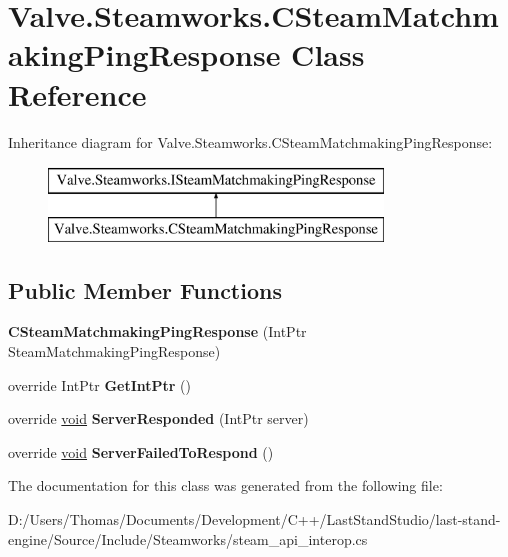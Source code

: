 \hypertarget{classValve_1_1Steamworks_1_1CSteamMatchmakingPingResponse}{}\section{Valve.\+Steamworks.\+C\+Steam\+Matchmaking\+Ping\+Response Class Reference}
\label{classValve_1_1Steamworks_1_1CSteamMatchmakingPingResponse}
Inheritance diagram for Valve.\+Steamworks.\+C\+Steam\+Matchmaking\+Ping\+Response\+:\begin{figure}[H]
\begin{center}
\leavevmode
\includegraphics[height=2.000000cm]{classValve_1_1Steamworks_1_1CSteamMatchmakingPingResponse}
\end{center}
\end{figure}
\subsection*{Public Member Functions}
\begin{DoxyCompactItemize}
\item 
\hypertarget{classValve_1_1Steamworks_1_1CSteamMatchmakingPingResponse_ac57e34502d75c480e69d792eed1e46d9}{}{\bfseries C\+Steam\+Matchmaking\+Ping\+Response} (Int\+Ptr Steam\+Matchmaking\+Ping\+Response)\label{classValve_1_1Steamworks_1_1CSteamMatchmakingPingResponse_ac57e34502d75c480e69d792eed1e46d9}

\item 
\hypertarget{classValve_1_1Steamworks_1_1CSteamMatchmakingPingResponse_a02a7e5fbedd2ba80ceb03daf7591a6ba}{}override Int\+Ptr {\bfseries Get\+Int\+Ptr} ()\label{classValve_1_1Steamworks_1_1CSteamMatchmakingPingResponse_a02a7e5fbedd2ba80ceb03daf7591a6ba}

\item 
\hypertarget{classValve_1_1Steamworks_1_1CSteamMatchmakingPingResponse_a12a44824fc2a99584cb25e6a79946402}{}override \hyperlink{SDL__audio_8h_a52835ae37c4bb905b903cbaf5d04b05f}{void} {\bfseries Server\+Responded} (Int\+Ptr server)\label{classValve_1_1Steamworks_1_1CSteamMatchmakingPingResponse_a12a44824fc2a99584cb25e6a79946402}

\item 
\hypertarget{classValve_1_1Steamworks_1_1CSteamMatchmakingPingResponse_a87be6983376560ecd9395f96c4b2c388}{}override \hyperlink{SDL__audio_8h_a52835ae37c4bb905b903cbaf5d04b05f}{void} {\bfseries Server\+Failed\+To\+Respond} ()\label{classValve_1_1Steamworks_1_1CSteamMatchmakingPingResponse_a87be6983376560ecd9395f96c4b2c388}

\end{DoxyCompactItemize}


The documentation for this class was generated from the following file\+:\begin{DoxyCompactItemize}
\item 
D\+:/\+Users/\+Thomas/\+Documents/\+Development/\+C++/\+Last\+Stand\+Studio/last-\/stand-\/engine/\+Source/\+Include/\+Steamworks/steam\+\_\+api\+\_\+interop.\+cs\end{DoxyCompactItemize}
